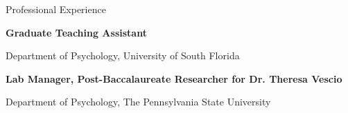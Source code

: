 \begin{rubric}{Professional Experience}

\textbf{Graduate Teaching Assistant} \par Department of Psychology, University of South Florida 

\textbf{Lab Manager, Post-Baccalaureate Researcher for Dr. Theresa Vescio} \par Department of Psychology, The Pennsylvania State University

\end{rubric}

